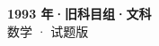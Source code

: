 \documentclass[zihao=-4, a4paper]{ctexart}
\begin{document}
\begin{center}
  {\Large\bfseries 1993 年·旧科目组·文科}\\[4pt]
  {\large 数学 · 试题版}
\end{center}
\medskip
{}

\end{document}

